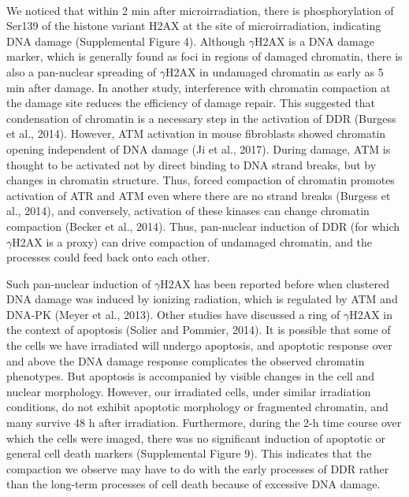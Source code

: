 \paragraph*{} We noticed that within 2 min after microirradiation, there is phosphorylation of Ser139 of the histone variant H2AX at the site of microirradiation, indicating DNA damage (Supplemental Figure 4). Although $\gamma$H2AX is a DNA damage marker, which is generally found as foci in regions of damaged chromatin, there is also a pan-nuclear spreading of $\gamma$H2AX in undamaged chromatin as early as 5 min after damage. In another study, interference with chromatin compaction at the damage site reduces the efficiency of damage repair. This suggested that condensation of chromatin is a necessary step in the activation of DDR (Burgess et al., 2014). However, ATM activation in mouse fibroblasts showed chromatin opening independent of DNA damage (Ji et al., 2017). During damage, ATM is thought to be activated not by direct binding to DNA strand breaks, but by changes in chromatin structure. Thus, forced compaction of chromatin promotes activation of ATR and ATM even where there are no strand breaks (Burgess et al., 2014), and conversely, activation of these kinases can change chromatin compaction (Becker et al., 2014). Thus, pan-nuclear induction of DDR (for which $\gamma$H2AX is a proxy) can drive compaction of undamaged chromatin, and the processes could feed back onto each other.

Such pan-nuclear induction of $\gamma$H2AX has been reported before when clustered DNA damage was induced by ionizing radiation, which is regulated by ATM and DNA-PK (Meyer et al., 2013). Other studies have discussed a ring of $\gamma$H2AX in the context of apoptosis (Solier and Pommier, 2014). It is possible that some of the cells we have irradiated will undergo apoptosis, and apoptotic response over and above the DNA damage response complicates the observed chromatin phenotypes. But apoptosis is accompanied by visible changes in the cell and nuclear morphology. However, our irradiated cells, under similar irradiation conditions, do not exhibit apoptotic morphology or fragmented chromatin, and many survive 48 h after irradiation. Furthermore, during the 2-h time course over which the cells were imaged, there was no significant induction of apoptotic or general cell death markers (Supplemental Figure 9). This indicates that the compaction we observe may have to do with the early processes of DDR rather than the long-term processes of cell death because of excessive DNA damage.

